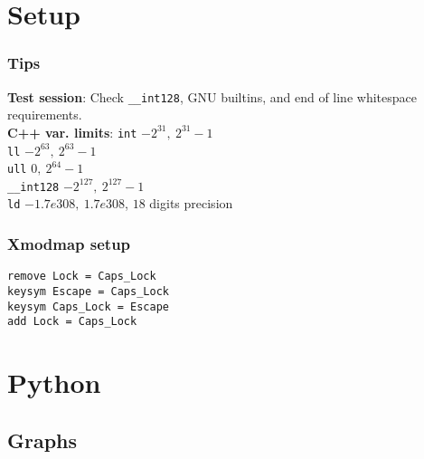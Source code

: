 \documentclass[
	a4paper,
	landscape,
	10pt,
]{article}
\begin{document}
\setcounter{tocdepth}{3}
\tableofcontents

\begin{multicols}{3}
\section{Setup}
\subsubsection{Tips}
\textbf{Test session}: Check \texttt{\_\_int128}, GNU builtins, and end of line whitespace requirements. \\
\textbf{C++ var. limits}: 
\texttt{int} $-2^{31},~2^{31}-1$ \\
\texttt{ll} $-2^{63},~2^{63}-1$ \\
\texttt{ull} $0,~2^{64}-1$ \\
\texttt{\_\_int128} $-2^{127},~2^{127}-1$\\
\texttt{ld} $-1.7e308,~1.7e308$, $18$ digits precision
\subsubsection{Xmodmap setup}
\texttt{remove Lock = Caps\_Lock} \\
\texttt{keysym Escape = Caps\_Lock} \\
\texttt{keysym Caps\_Lock = Escape} \\
\texttt{add Lock = Caps\_Lock} \\


\section{Python}
\subsection{Graphs}
	

\end{multicols}
\end{document}
